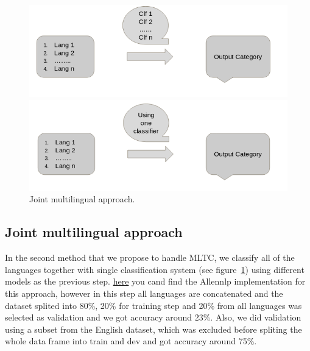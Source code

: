 \documentclass[letterpaper,12pt]{article}
\begin{document}
\begin{figure}
	\centering
	\begin{minipage}[b]{.4\textwidth}
		\centering \includegraphics[width=0.8\columnwidth]{4.png}
		
		\caption{
			\label{fig:5} %
			Multiple Monolingual Classification
		}
		
	\end{minipage}\qquad
	\begin{minipage}[b]{.4\textwidth}
		
		\centering \includegraphics[width=0.8\columnwidth]{3.png}
		
		\caption{
			\label{fig:6} %
			Joint multilingual approach.
		}
		
	\end{minipage}
\end{figure}

\subsection{Joint multilingual approach}
In the second method that we propose to handle MLTC, we classify all of the languages together with single classification system (see figure~\ref{fig:6}) using different models as the previous step. \href{https://github.com/Mkamel104/MLTC/blob/master/AllenNlp/AllenNlp_PHASEI_PHASEII_PHASEIII.ipynb}{here} you cand find the Allennlp implementation for this approach, however in this step all languages are concatenated and the dataset splited into 80\%, 20\% for training step and 20\% from all languages was selected as validation and we got accuracy around 23\%. Also, we did validation using a subset from the English dataset, which was excluded before spliting the whole data frame into train and dev and got accuracy around 75\%. 
\end{document}

